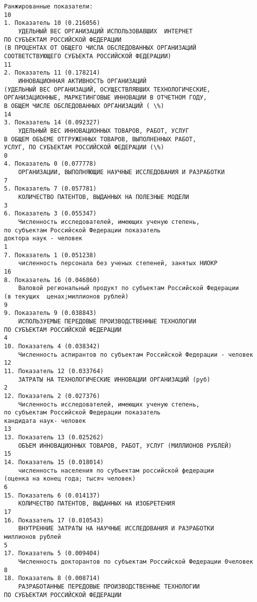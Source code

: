 \documentclass[11pt]{article}
\begin{document}
    \begin{Verbatim}[commandchars=\\\{\}]
Ранжированные показатели:
10
1. Показатель 10 (0.216056)
	УДЕЛЬНЫЙ ВЕС ОРГАНИЗАЦИЙ ИСПОЛЬЗОВАВШИХ  ИНТЕРНЕТ
ПО СУБЪЕКТАМ РОССИЙСКОЙ ФЕДЕРАЦИИ
(В ПРОЦЕНТАХ ОТ ОБЩЕГО ЧИСЛА ОБСЛЕДОВАННЫХ ОРГАНИЗАЦИЙ
СООТВЕТСТВУЮЩЕГО СУБЪЕКТА РОССИЙСКОЙ ФЕДЕРАЦИИ)
11
2. Показатель 11 (0.178214)
	ИННОВАЦИОННАЯ АКТИВНОСТЬ ОРГАНИЗАЦИЙ
(УДЕЛЬНЫЙ ВЕС ОРГАНИЗАЦИЙ, ОСУЩЕСТВЛЯВШИХ ТЕХНОЛОГИЧЕСКИЕ,
ОРГАНИЗАЦИОННЫЕ, МАРКЕТИНГОВЫЕ ИННОВАЦИИ В ОТЧЕТНОМ ГОДУ,
В ОБЩЕМ ЧИСЛЕ ОБСЛЕДОВАННЫХ ОРГАНИЗАЦИЙ ( \%)
14
3. Показатель 14 (0.092327)
	УДЕЛЬНЫЙ ВЕС ИННОВАЦИОННЫХ ТОВАРОВ, РАБОТ, УСЛУГ
В ОБЩЕМ ОБЪЕМЕ ОТГРУЖЕННЫХ ТОВАРОВ, ВЫПОЛНЕННЫХ РАБОТ,
УСЛУГ, ПО СУБЪЕКТАМ РОССИЙСКОЙ ФЕДЕРАЦИИ (\%)
0
4. Показатель 0 (0.077778)
	ОРГАНИЗАЦИИ, ВЫПОЛНЯЮЩИЕ НАУЧНЫЕ ИССЛЕДОВАНИЯ И РАЗРАБОТКИ
7
5. Показатель 7 (0.057781)
	КОЛИЧЕСТВО ПАТЕНТОВ, ВЫДАННЫХ НА ПОЛЕЗНЫЕ МОДЕЛИ
3
6. Показатель 3 (0.055347)
	Численность исследователей, имеющих ученую степень,
по субъектам Российской Федерации показатель
доктора наук - человек
1
7. Показатель 1 (0.051238)
	численность персонала без ученых степеней, занятых НИОКР
16
8. Показатель 16 (0.046860)
	Валовой региональный продукт по субъектам Российской Федерации
(в текущих  ценах;миллионов рублей)
9
9. Показатель 9 (0.038843)
	ИСПОЛЬЗУЕМЫЕ ПЕРЕДОВЫЕ ПРОИЗВОДСТВЕННЫЕ ТЕХНОЛОГИИ
ПО СУБЪЕКТАМ РОССИЙСКОЙ ФЕДЕРАЦИИ
4
10. Показатель 4 (0.038342)
	Численность аспирантов по субъектам Российской Федерации - человек
12
11. Показатель 12 (0.033764)
	ЗАТРАТЫ НА ТЕХНОЛОГИЧЕСКИЕ ИННОВАЦИИ ОРГАНИЗАЦИЙ (руб)
2
12. Показатель 2 (0.027376)
	Численность исследователей, имеющих ученую степень,
по субъектам Российской Федерации показатель
кандидата наук- человек
13
13. Показатель 13 (0.025262)
	ОБЪЕМ ИННОВАЦИОННЫХ ТОВАРОВ, РАБОТ, УСЛУГ (МИЛЛИОНОВ РУБЛЕЙ)
15
14. Показатель 15 (0.018014)
	численность населения по субъектам российской федерации
(оценка на конец года; тысяч человек)
6
15. Показатель 6 (0.014137)
	КОЛИЧЕСТВО ПАТЕНТОВ, ВЫДАННЫХ НА ИЗОБРЕТЕНИЯ
17
16. Показатель 17 (0.010543)
	ВНУТРЕННИЕ ЗАТРАТЫ НА НАУЧНЫЕ ИССЛЕДОВАНИЯ И РАЗРАБОТКИ
миллионов рублей
5
17. Показатель 5 (0.009404)
	Численность докторантов по субъектам Российской Федерации 0человек
8
18. Показатель 8 (0.008714)
	РАЗРАБОТАННЫЕ ПЕРЕДОВЫЕ ПРОИЗВОДСТВЕННЫЕ ТЕХНОЛОГИИ
ПО СУБЪЕКТАМ РОССИЙСКОЙ ФЕДЕРАЦИИ

    \end{Verbatim}

    \begin{center}
    \end{center}
    { \hspace*{\fill} \\}
   
\end{document}
